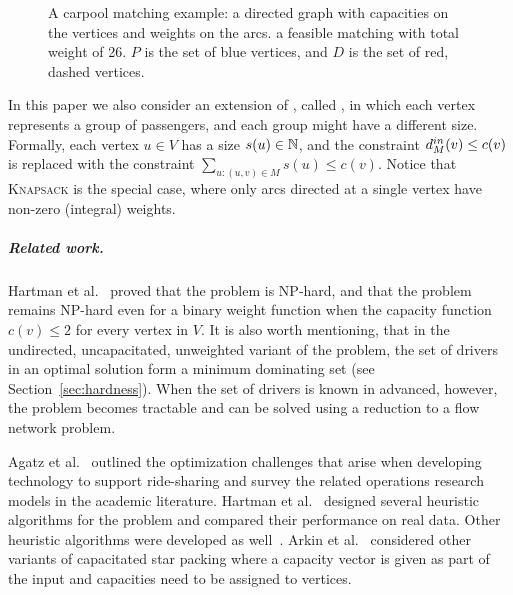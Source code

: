 \begin{figure}
\centering

\caption[]{
\label{fig:carpool}
A carpool matching example: 
a directed graph with capacities on the vertices and weights on the arcs. 
a feasible matching with total weight of 26.
$P$ is the set of blue vertices, and $D$ is the set of red, dashed vertices. 
}
\end{figure}  

In this paper we also consider an extension of \carpool, called \gcp,
in which each vertex represents a group of passengers, and  
each group might have a different size. 
Formally, each vertex $u \in V$ has a size $s(u) \in \N$, 
and the constraint $\din[M](v) \leq c(v)$ is replaced with the constraint
$\sum_{u:(u,v) \in M} s(u) \leq c(v)$.
%
Notice that \textsc{Knapsack} is the special case, where only
arcs directed at a single vertex have non-zero (integral) weights.


\subparagraph{Related work.}
%
Hartman et al.~\cite{hartman2013optimal} proved that the \carpool
problem is NP-hard, and that the problem
remains NP-hard even for a binary weight function when the capacity
function $c(v) \leq 2$ for every vertex in $V$.  It is also worth
mentioning, that in the undirected, uncapacitated, unweighted variant
of the problem, the set of drivers in an optimal solution form a
minimum dominating set (see Section~\ref{sec:hardness}).  When the set
of drivers is known in advanced, however, the problem becomes
tractable and can be solved using a reduction to a flow network
problem.

Agatz et al.~\cite{agatz2012optimization} outlined the optimization
challenges that arise when developing technology to support
ride-sharing and survey the related operations research models in the
academic literature.  Hartman et al.~\cite{hartman2014theory} designed
several heuristic algorithms for the \carpool problem and compared
their performance on real data.  Other heuristic algorithms were
developed as well~\cite{knapen2014exploiting}.  Arkin et
al.~\cite{arkin2004approximations} considered other variants of
capacitated star packing where a capacity vector is given as part of
the input and capacities need to be assigned to vertices.

